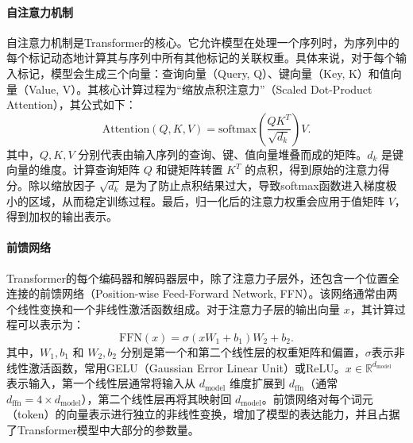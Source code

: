 \paragraph{自注意力机制}
自注意力机制是Transformer的核心。它允许模型在处理一个序列时，为序列中的每个标记动态地计算其与序列中所有其他标记的关联权重。具体来说，对于每个输入标记，模型会生成三个向量：查询向量（Query, Q）、键向量（Key, K）和值向量（Value, V）。其核心计算过程为“缩放点积注意力”（Scaled Dot-Product Attention），其公式如下：
\begin{equation}
\text{Attention}(Q, K, V) = \text{softmax}\left(\frac{QK^T}{\sqrt{d_k}}\right)V.
\end{equation}
其中，$Q, K, V$ 分别代表由输入序列的查询、键、值向量堆叠而成的矩阵。$d_k$ 是键向量的维度。计算查询矩阵 $Q$ 和键矩阵转置 $K^T$ 的点积，得到原始的注意力得分。除以缩放因子 $\sqrt{d_k}$ 是为了防止点积结果过大，导致softmax函数进入梯度极小的区域，从而稳定训练过程。最后，归一化后的注意力权重会应用于值矩阵 $V$，得到加权的输出表示。

\paragraph{前馈网络}
Transformer的每个编码器和解码器层中，除了注意力子层外，还包含一个位置全连接的前馈网络（Position-wise Feed-Forward Network, FFN）。该网络通常由两个线性变换和一个非线性激活函数组成。对于注意力子层的输出向量 $x$，其计算过程可以表示为：
\begin{equation}
\text{FFN}(x) = \sigma(xW_1 + b_1) W_2 + b_2.
\end{equation}
其中，$W_1, b_1$ 和 $W_2, b_2$ 分别是第一个和第二个线性层的权重矩阵和偏置，$\sigma$表示非线性激活函数，常用GELU（Gaussian Error Linear Unit）\cite{Hendrycks2016GaussianEL}或ReLU\cite{Nair2010RectifiedLU}。$x \in \mathbb{R}^{d_{\text{model}}}$ 表示输入，第一个线性层通常将输入从 $d_{\text{model}}$ 维度扩展到 $d_{\text{ffn}}$（通常 $d_{\text{ffn}} = 4 \times d_{\text{model}}$），第二个线性层再将其映射回 $d_{\text{model}}$。前馈网络对每个词元（token）的向量表示进行独立的非线性变换，增加了模型的表达能力，并且占据了Transformer模型中大部分的参数量。

